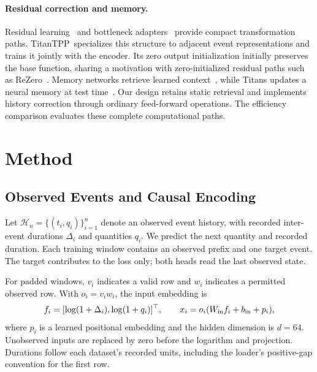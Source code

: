 \documentclass[runningheads]{llncs}
\newcommand{\method}{TitanTPP}
\newcommand{\Hcal}{\mathcal{H}}
\begin{document}
\paragraph{Residual correction and memory.}
Residual learning~\cite{he2016residual} and bottleneck
adapters~\cite{houlsby2019adapters} provide compact transformation paths.
\method\ specializes this structure to adjacent event representations and
trains it jointly with the encoder. Its zero output initialization initially
preserves the base function, sharing a motivation with zero-initialized
residual paths such as ReZero~\cite{bachlechner2021rezero}.
Memory networks retrieve learned context~\cite{sukhbaatar2015memory}, while
Titans updates a neural memory at test time~\cite{behrouz2025titans}.
Our design retains static retrieval and implements history correction through
ordinary feed-forward operations. The efficiency comparison evaluates these
complete computational paths.

\section{Method}
\subsection{Observed Events and Causal Encoding}
Let $\Hcal_n=\{(t_i,q_i)\}_{i=1}^{n}$ denote an observed event history,
with recorded inter-event durations $\Delta_i$ and quantities $q_i$.
We predict the next quantity and recorded duration. Each training window
contains an observed prefix and one target event. The target contributes to
the loss only; both heads read the last observed state.

For padded windows, $v_i$ indicates a valid row and $w_i$ indicates a permitted
observed row. With $o_i=v_iw_i$, the input embedding is
\begin{equation}
 f_i=[\log(1+\Delta_i),\log(1+q_i)]^\top,\qquad
 x_i=o_i(W_{\rm in}f_i+b_{\rm in}+p_i),
 \label{eq:input}
\end{equation}
where $p_i$ is a learned positional embedding and the hidden dimension is
$d=64$. Unobserved inputs are replaced by zero before the logarithm and
projection. Durations follow each dataset's recorded units, including the
loader's positive-gap convention for the first row.
\end{document}
